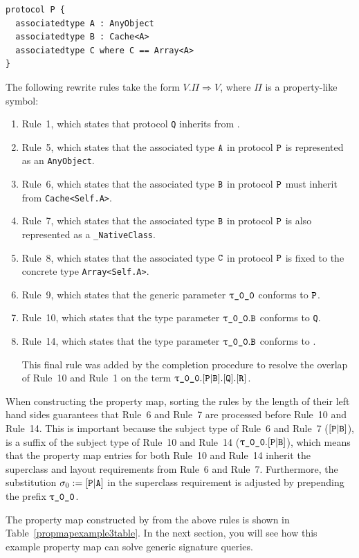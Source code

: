 \documentclass[../generics]{subfiles}
\begin{document}
\begin{example}
\begin{listing}
\begin{Verbatim}
protocol P {
  associatedtype A : AnyObject
  associatedtype B : Cache<A>
  associatedtype C where C == Array<A>
}
\end{Verbatim}
\end{listing}
The following rewrite rules take the form $V.\Pi\Rightarrow V$, where $\Pi$ is a property-like symbol:
\begin{enumerate}
\item Rule~1, which states that protocol \texttt{Q} inherits from \tR.
\item Rule~5, which states that the associated type $\texttt{A}$ in protocol $\texttt{P}$ is represented as an \texttt{AnyObject}.
\item Rule~6, which states that the associated type $\texttt{B}$ in protocol $\texttt{P}$ must inherit from \texttt{Cache<Self.A>}.
\item Rule~7, which states that the associated type $\texttt{B}$ in protocol $\texttt{P}$ is also represented as a \texttt{\_NativeClass}.
\item Rule~8, which states that the associated type $\texttt{C}$ in protocol $\texttt{P}$ is fixed to the concrete type \texttt{Array<Self.A>}.
\item Rule~9, which states that the generic parameter $\rT$ conforms to $\texttt{P}$.
\item Rule~10, which states that the type parameter $\rT.\nB$ conforms to \texttt{Q}.
\item Rule~14, which states that the type parameter $\rT.\nB$ conforms to \tR.

This final rule was added by the completion procedure to resolve the overlap of Rule~10 and Rule~1 on the term $\rT.\assocsym{P}{B}.\pQ.\pR$.
\end{enumerate}
When constructing the property map, sorting the rules by the length of their left hand sides guarantees that Rule~6 and Rule~7 are processed before Rule~10 and Rule~14. This is important because the subject type of Rule~6 and Rule~7 ($[\texttt{P}|\texttt{B}]$), is a suffix of the subject type of Rule~10 and Rule~14 ($\rT.\assocsym{P}{B}$), which means that the property map entries for both Rule~10 and Rule~14 inherit the superclass and layout requirements from Rule~6 and Rule~7. Furthermore, the substitution $\sigma_0:=[\texttt{P}|\texttt{A}]$ in the superclass requirement is adjusted by prepending the prefix $\rT$.

The property map constructed by  from the above rules is shown in Table~\ref{propmapexample3table}.
In the next section, you will see how this example property map can solve generic signature queries.


\end{example}
\end{document}
